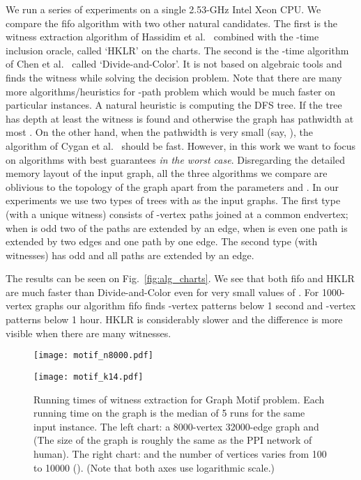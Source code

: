 \documentclass[11pt]{article}
\begin{document}
We run a series of experiments on a single 2.53-GHz Intel Xeon CPU. 
We compare the fifo algorithm with two other natural candidates. The first is the witness extraction algorithm of Hassidim et al.~\cite{hklr_wads} combined with the -time inclusion oracle, called `HKLR' on the charts. The second is the -time algorithm of Chen et al.~\cite{Chen+SICOMP09} called `Divide-and-Color'. It is not based on algebraic tools and finds the witness while solving the decision problem. 
Note that there are many more algorithms/heuristics for -path problem which would be much faster on particular instances. 
A natural heuristic is computing the DFS tree. If the tree has depth at least  the witness is found and otherwise the graph has pathwidth at most . On the other hand, when the pathwidth  is very small (say, ), the  algorithm of Cygan et al.~\cite{CNK:Hamiltonicity} should be fast. However, in this work we want to focus on algorithms with best guarantees {\em in the worst case}. Disregarding the detailed memory layout of the input graph, all the three algorithms we compare are oblivious to the topology of the graph apart from the parameters  and . In our experiments we use two types of trees with  as the input graphs. 
The first type (with a unique witness) consists of -vertex paths joined at a common endvertex; when  is odd two of the paths are extended by an edge, when  is even one path is extended by two edges and one path by one edge. The second type (with  witnesses) has  odd and all paths are extended by an edge.

The results can be seen on Fig.~\ref{fig:alg_charts}. We see that both fifo and HKLR are much faster than Divide-and-Color even for very small values of . For 1000-vertex graphs our algorithm fifo finds -vertex patterns below 1 second and -vertex patterns below 1 hour.
HKLR is considerably slower and the difference is more visible when there are many witnesses. 

\begin{figure}[t]
\begin{minipage}[b]{0.5\linewidth}
\centering
\texttt{[image: motif\_n8000.pdf]}
\end{minipage}
\begin{minipage}[b]{0.5\linewidth}
\centering
\texttt{[image: motif\_k14.pdf]}
\end{minipage}
\caption{Running times of witness extraction for Graph Motif problem. 
         Each running time on the graph is the median of 5 runs for the same input instance.
         The left chart: a 8000-vertex 32000-edge graph and  
         (The size of the graph is roughly the same as the PPI network of human).
         The right chart:  and the number of vertices varies from 100 to 10000 ().
         (Note that both axes use logarithmic scale.)
         }
\label{fig:motif_charts}
\end{figure}
\end{document}
